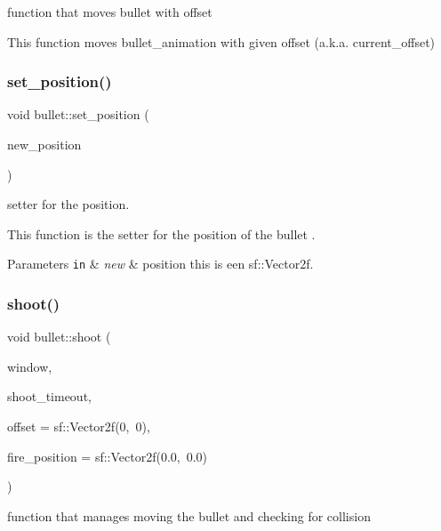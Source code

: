 function that moves bullet with offset 

This function moves bullet\+\_\+animation with given offset (a.\+k.\+a. current\+\_\+offset) \mbox{\label{classbullet_af338da31bfb1dd4b2d942ca67316350a}} 
\subsubsection{\texorpdfstring{set\+\_\+position()}{set\_position()}}
{\footnotesize\ttfamily void bullet\+::set\+\_\+position (\begin{DoxyParamCaption}\item[{sf\+::\+Vector2f}]{new\+\_\+position }\end{DoxyParamCaption})}



setter for the position. 

This function is the setter for the position of the bullet .


\begin{DoxyParams}[1]{Parameters}
\mbox{\tt in}  & {\em new} & position this is een sf\+::\+Vector2f. \\
\hline
\end{DoxyParams}
\mbox{\label{classbullet_a52d736cad2a486a65c8a25781cff1f70}} 
\subsubsection{\texorpdfstring{shoot()}{shoot()}}
{\footnotesize\ttfamily void bullet\+::shoot (\begin{DoxyParamCaption}\item[{sf\+::\+Render\+Window \&}]{window,  }\item[{int \&}]{shoot\+\_\+timeout,  }\item[{sf\+::\+Vector2f}]{offset = {\ttfamily sf\+:\+:Vector2f(0,~0)},  }\item[{sf\+::\+Vector2f}]{fire\+\_\+position = {\ttfamily sf\+:\+:Vector2f(0.0,~0.0)} }\end{DoxyParamCaption})}



function that manages moving the bullet and checking for collision 

